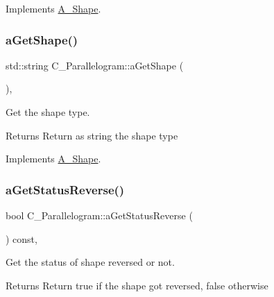 Implements \hyperlink{classA__Shape_a9fd1285bd63b1fc88943c9969bf01a5c}{A\+\_\+\+Shape}.

\mbox{\label{classC__Parallelogram_a373fdd3ebdfeffcaa0a72ff7001af8ec}} 
\subsubsection{\texorpdfstring{a\+Get\+Shape()}{aGetShape()}}
{\footnotesize\ttfamily std\+::string C\+\_\+\+Parallelogram\+::a\+Get\+Shape (\begin{DoxyParamCaption}{ }\end{DoxyParamCaption})\hspace{0.3cm}{\ttfamily [override]}, {\ttfamily [virtual]}}



Get the shape type. 

\begin{DoxyReturn}{Returns}
Return as string the shape type 
\end{DoxyReturn}


Implements \hyperlink{classA__Shape_a1b202256a4e5dcb0edab4ab93a37122c}{A\+\_\+\+Shape}.

\mbox{\label{classC__Parallelogram_a14b00a011ff4fe3170c5ab11af628252}} 
\subsubsection{\texorpdfstring{a\+Get\+Status\+Reverse()}{aGetStatusReverse()}}
{\footnotesize\ttfamily bool C\+\_\+\+Parallelogram\+::a\+Get\+Status\+Reverse (\begin{DoxyParamCaption}{ }\end{DoxyParamCaption}) const\hspace{0.3cm}{\ttfamily [override]}, {\ttfamily [virtual]}}



Get the status of shape reversed or not. 

\begin{DoxyReturn}{Returns}
Return true if the shape got reversed, false otherwise 
\end{DoxyReturn}


